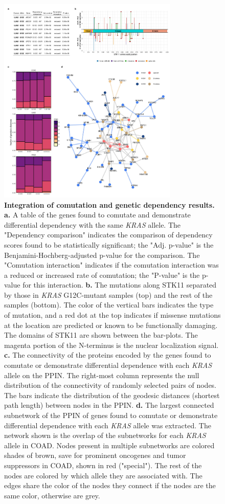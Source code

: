 \documentclass[english, 10pt, letterpaper]{article}
\newcommand{\KRAS}{\emph{KRAS}}
\begin{document}
\begin{figure}[p]
\centering
\includegraphics[height=100mm]{figures/Figure_05.jpeg}
\caption{
    \textbf{Integration of comutation and genetic dependency results.}
    \textbf{a.} A table of the genes found to comutate and demonstrate differential dependency with the same \KRAS{} allele. The "Dependency comparison" indicates the comparison of dependency scores found to be statistically significant; the "Adj. p-value" is the Benjamini-Hochberg-adjusted p-value for the comparison. The "Comutation interaction" indicates if the comutation interaction was a reduced or increased rate of comutation; the "P-value" is the p-value for this interaction.
    \textbf{b.} The mutations along STK11 separated by those in \KRAS{} G12C-mutant samples (top) and the rest of the samples (bottom). The color of the vertical bars indicates the type of mutation, and a red dot at the top indicates if missense mutations at the location are predicted or known to be functionally damaging. The domains of STK11 are shown between the bar-plots. The magenta portion of the N-terminus is the nuclear localization signal.
    \textbf{c.} The connectivity of the proteins encoded by the genes found to comutate or demonstrate differential dependence with each \KRAS{} allele on the PPIN. The right-most column represents the null distribution of the connectivity of randomly selected pairs of nodes. The bars indicate the distribution of the geodesic distances (shortest path length) between nodes in the PPIN.
    \textbf{d.} The largest connected subnetwork of the PPIN of genes found to comutate or demonstrate differential dependence with each \KRAS{} allele was extracted. The network shown is the overlap of the subnetworks for each \KRAS{} allele in COAD. Nodes present in multiple subnetworks are colored shades of brown, save for prominent oncogenes and tumor suppressors in COAD, shown in red ("special"). The rest of the nodes are colored by which allele they are associated with. The edges share the color of the nodes they connect if the nodes are the same color, otherwise are grey.
}
\label{fig:results-integration-main}
\end{figure}
\end{document}
